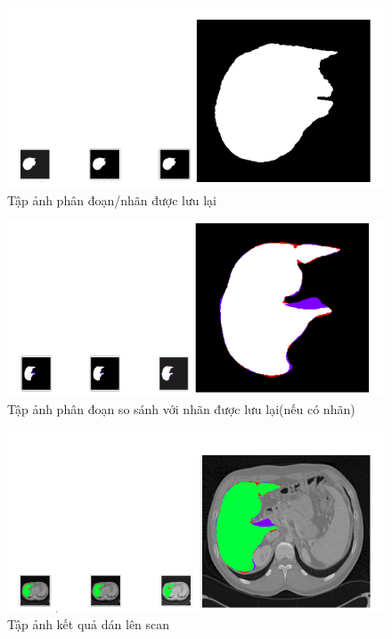\begin{figure}[h]
\centering
    \includegraphics[totalheight=7cm]{Images/app_listlabel.png}
    \caption{Tập ảnh phân đoạn/nhãn được lưu lại}
    \label{skip_conn}
\end{figure}

\begin{figure}[h]
\centering
    \includegraphics[totalheight=7cm]{Images/app_listcompare.png}
    \caption{Tập ảnh phân đoạn so sánh với nhãn được lưu lại(nếu có nhãn)}
    \label{skip_conn}
\end{figure}


\begin{figure}[h]
\centering
    \includegraphics[totalheight=7cm]{Images/app_listoverlap.png}
    \caption{Tập ảnh kết quả dán lên scan}
    \label{skip_conn}
\end{figure}

